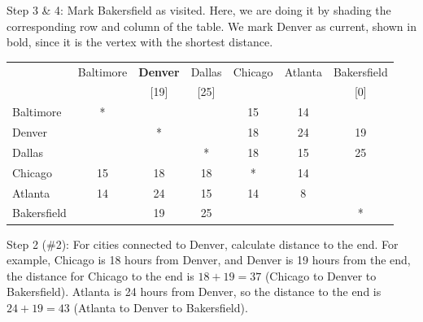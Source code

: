 \begin{example}{}{}
\noindent Step 3 \& 4:  Mark Bakersfield as visited.  Here, we are doing it by shading the corresponding row and column of the table.  We mark Denver as current, shown in bold, since it is the vertex with the shortest distance.
 \begin{center}
 \begin{tabular}{|l|c|c|c|c|c|c|}
 \hline
 & Baltimore & \textbf{Denver} & Dallas & Chicago & Atlanta & \cellcolor{yellow}Bakersfield\\
 &&[19]&[25]&&&\cellcolor{yellow}[0]\\
 \hline
 Baltimore & * &&&15&14&\cellcolor{yellow}\\
 \hline
 Denver &&*&&18&24&\cellcolor{yellow}19\\
 \hline
Dallas&&&*&18&15&\cellcolor{yellow}25\\
 \hline
 Chicago &15&18&18&*&14&\cellcolor{yellow}\\
 \hline
 Atlanta & 14 & 24&15&14&8&\cellcolor{yellow}\\
 \hline
 \cellcolor{yellow}Bakersfield &\cellcolor{yellow}&\cellcolor{yellow}19&\cellcolor{yellow}25&\cellcolor{yellow}&\cellcolor{yellow}&\cellcolor{yellow}*\\
 \hline
 \end{tabular}
 \end{center}


\noindent Step 2 (\#2):  For cities connected to Denver, calculate distance to the end.  For example, Chicago is 18 hours from Denver, and Denver is 19 hours from the end, the distance for Chicago to the end is $18+19 = 37$  (Chicago to Denver to Bakersfield).  Atlanta is 24 hours from Denver, so the distance to the end is $24+19 = 43$ (Atlanta to Denver to Bakersfield).\\


\end{example}
